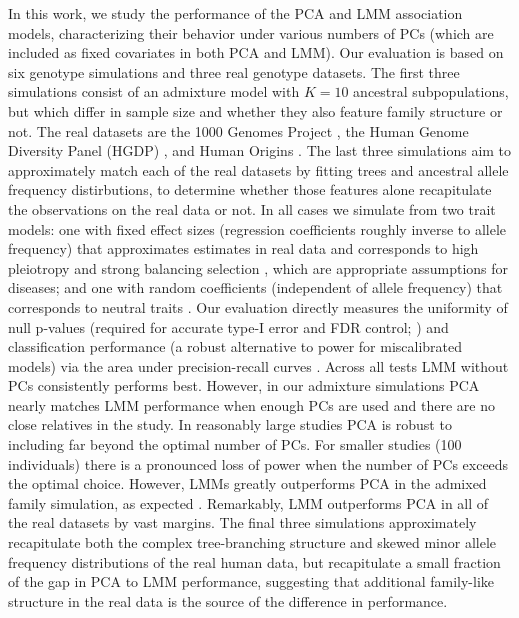 \documentclass[11pt]{article}
\begin{document}
In this work, we study the performance of the PCA and LMM association models, characterizing their behavior under various numbers of PCs (which are included as fixed covariates in both PCA and LMM).
Our evaluation is based on six genotype simulations and three real genotype datasets.
The first three simulations consist of an admixture model with $K = 10$ ancestral subpopulations, but which differ in sample size and whether they also feature family structure or not.
The real datasets are the 1000 Genomes Project \citep{the_1000_genomes_project_consortium_map_2010, 1000_genomes_project_consortium_integrated_2012}, the Human Genome Diversity Panel (HGDP) \citep{cann_human_2002, rosenberg_genetic_2002, bergstrom_insights_2020}, and Human Origins \citep{patterson_ancient_2012, lazaridis_ancient_2014, lazaridis_genomic_2016, skoglund_genomic_2016}.
The last three simulations aim to approximately match each of the real datasets by fitting trees and ancestral allele frequency distirbutions, to determine whether those features alone recapitulate the observations on the real data or not.
In all cases we simulate from two trait models: one with fixed effect sizes (regression coefficients roughly inverse to allele frequency) that approximates estimates in real data \citep{park_distribution_2011} and corresponds to high pleiotropy and strong balancing selection \citep{simons_population_2018}, which are appropriate assumptions for diseases; and one with random coefficients (independent of allele frequency) that corresponds to neutral traits \citep{simons_population_2018}.
Our evaluation directly measures the uniformity of null p-values (required for accurate type-I error and FDR control; \cite{storey_positive_2003, storey_statistical_2003}) and classification performance (a robust alternative to power for miscalibrated models) via the area under precision-recall curves \citep{grau_prroc:_2015}.
Across all tests LMM without PCs consistently performs best.
However, in our admixture simulations PCA nearly matches LMM performance when enough PCs are used and there are no close relatives in the study.
In reasonably large studies PCA is robust to including far beyond the optimal number of PCs.
For smaller studies (100 individuals) there is a pronounced loss of power when the number of PCs exceeds the optimal choice.
However, LMMs greatly outperforms PCA in the admixed family simulation, as expected \citep{patterson_population_2006, price_new_2010}.
Remarkably, LMM outperforms PCA in all of the real datasets by vast margins.
The final three simulations approximately recapitulate both the complex tree-branching structure and skewed minor allele frequency distributions of the real human data, but recapitulate a small fraction of the gap in PCA to LMM performance, suggesting that additional family-like structure in the real data is the source of the difference in performance.
\end{document}
